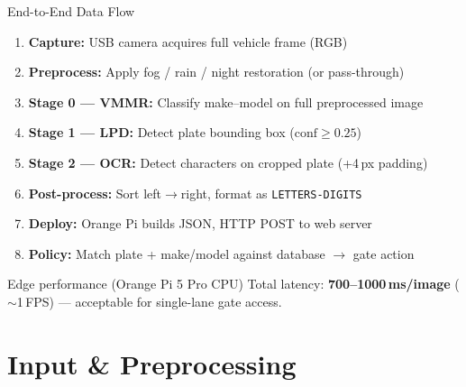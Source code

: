 \documentclass[aspectratio=169,11pt]{beamer}
\begin{document}
\begin{frame}{End-to-End Data Flow}
  \small
  \begin{enumerate}
    \item \textbf{Capture:} USB camera acquires full vehicle frame (RGB)
    \item \textbf{Preprocess:} Apply fog / rain / night restoration (or pass-through)
    \item \textbf{Stage 0 --- VMMR:} Classify make--model on full preprocessed image
    \item \textbf{Stage 1 --- LPD:} Detect plate bounding box ($\text{conf} \geq 0.25$)
    \item \textbf{Stage 2 --- OCR:} Detect characters on cropped plate (+4\,px padding)
    \item \textbf{Post-process:} Sort left$\rightarrow$right, format as \texttt{LETTERS-DIGITS}
    \item \textbf{Deploy:} Orange Pi builds JSON, HTTP POST to web server
    \item \textbf{Policy:} Match plate + make/model against database $\rightarrow$ gate action
  \end{enumerate}
  \vspace{0.3em}
  \begin{exampleblock}{Edge performance (Orange Pi 5 Pro CPU)}
    Total latency: \textbf{700--1000\,ms/image} ($\sim$1\,FPS) --- acceptable for single-lane gate access.
  \end{exampleblock}
\end{frame}

\section{Input \& Preprocessing}
\end{document}
